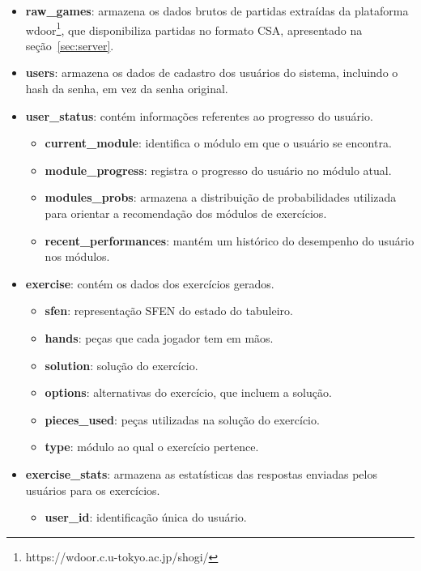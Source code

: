     \begin{itemize}
        \item \textbf{raw\_games}: armazena os dados brutos de partidas extraídas da plataforma wdoor\footnote{https://wdoor.c.u-tokyo.ac.jp/shogi/}, que disponibiliza partidas no formato CSA, apresentado na seção~\ref{sec:server}.
        \item \textbf{users}: armazena os dados de cadastro dos usuários do sistema, incluindo o hash da senha, em vez da senha original.
        \item \textbf{user\_status}: contém informações referentes ao progresso do usuário. 
        \begin{itemize}
            \item \textbf{current\_module}: identifica o módulo em que o usuário se encontra.
            \item \textbf{module\_progress}: registra o progresso do usuário no módulo atual.
            \item \textbf{modules\_probs}: armazena a distribuição de probabilidades utilizada para orientar a recomendação dos módulos de exercícios.
            \item \textbf{recent\_performances}:  mantém um histórico do desempenho do usuário nos módulos.
        \end{itemize}
        \item \textbf{exercise}: contém os dados dos exercícios gerados.
        \begin{itemize}
            \item \textbf{sfen}: representação SFEN do estado do tabuleiro.
            \item \textbf{hands}: peças que cada jogador tem em mãos.
            \item \textbf{solution}: solução do exercício.
            \item \textbf{options}: alternativas do exercício, que incluem a solução.
            \item \textbf{pieces\_used}: peças utilizadas na solução do exercício.
            \item \textbf{type}: módulo ao qual o exercício pertence.
        \end{itemize}
        \item \textbf{exercise\_stats}: armazena as estatísticas das respostas enviadas pelos usuários para os exercícios.
        \begin{itemize}
            \item \textbf{user\_id}: identificação única do usuário.

\end{itemize}
\end{itemize}
